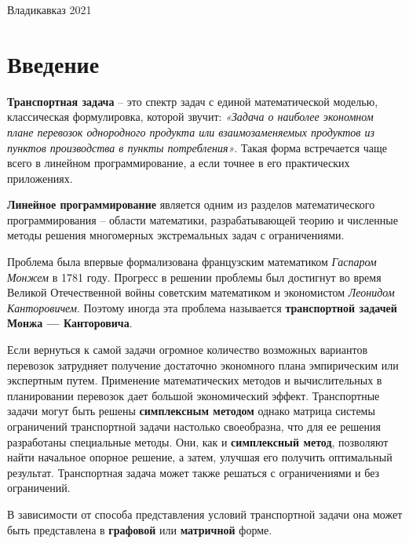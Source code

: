 \documentclass[a4paper,12pt]{article}
\begin{document}
\normalsize{ \hspace{28pt}} \hfill \break
\begin{center} Владикавказ 2021 \end{center}

\thispagestyle{empty}
\tableofcontents
\thispagestyle{empty}
\clearpage
\newtheorem{theorem}{Теорема}

\section {Введение}
	\textbf{Транспортная задача} – это спектр задач с единой математической моделью, классическая формулировка, которой звучит: \textit{«Задача о наиболее экономном плане перевозок однородного продукта или взаимозаменяемых продуктов из пунктов производства в пункты потребления»}. Такая форма встречается чаще всего в линейном программирование, а если точнее в его практических приложениях. 
	
	\textbf{Линейное программирование} является одним из разделов математического программирования – области математики, разрабатывающей теорию и численные методы решения многомерных экстремальных задач с ограничениями.
	
	Проблема была впервые формализована французским математиком \textit{Гаспаром Монжем} в 1781 году. Прогресс в решении проблемы был достигнут во время Великой Отечественной войны советским математиком и экономистом \textit{Леонидом Канторовичем}. Поэтому иногда эта проблема называется \textbf{транспортной задачей Монжа — Канторовича}.
	
	Если вернуться к самой задачи огромное количество возможных вариантов перевозок затрудняет получение достаточно экономного плана эмпирическим или экспертным путем. Применение математических методов и вычислительных в планировании перевозок дает большой экономический эффект. Транспортные задачи могут быть решены \textbf{симплексным методом} однако матрица системы ограничений транспортной задачи настолько своеобразна, что для ее решения разработаны специальные методы. Они, как и \textbf{симплексный метод}, позволяют найти начальное опорное решение, а затем, улучшая его получить оптимальный результат. Транспортная задача может
	также решаться с ограничениями и без ограничений.
	
	В зависимости от способа представления условий транспортной задачи она может быть представлена в \textbf{графовой} или \textbf{матричной} форме.
	
	\clearpage
	
\end{document}
